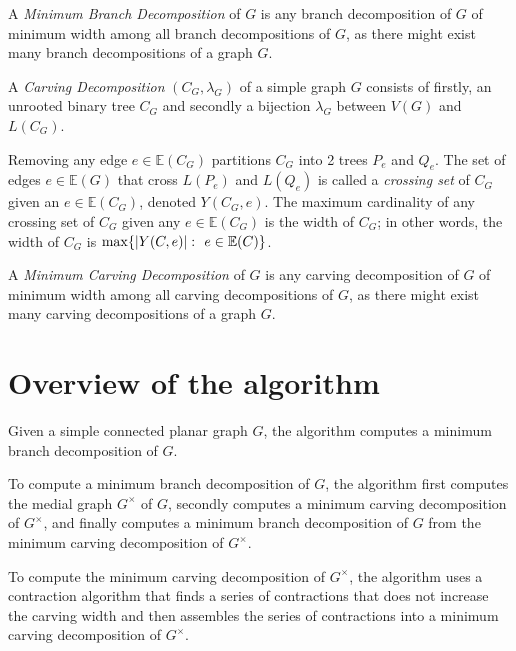 \documentclass{article}
\begin{document}

	A \textit{Minimum Branch Decomposition} of $G$ is any branch decomposition of $G$ of minimum width among all branch decompositions of $G$, as there might exist many branch decompositions of a graph $G$.

	\begin{center}
		
	\end{center}

	A \textit{Carving Decomposition} $(C_G, \lambda_G)$ of a simple graph $G$ consists of firstly, an unrooted binary tree $C_G$ and secondly a bijection $\lambda_G$ between $V(G)$ and $L(C_G)$.

	Removing any edge $e \in \mathbb{E}(C_G)$ partitions $C_G$ into 2 trees $P_e$ and $Q_e$. The set of edges $e \in \mathbb{E}(G)$ that cross $L(P_e)$ and $L(Q_e)$ is called a \textit{crossing set} of $C_G$ given an $e \in \mathbb{E}(C_G)$, denoted $Y(C_G,e)$. The maximum cardinality of any crossing set of $C_G$ given any $e \in \mathbb{E}(C_G)$ is the width of $C_G$; in other words, the width of $C_G$ is $\max\{ |Y(C, e)| \,\colon\  e \in \mathbb{E}(C) \}$.

	A \textit{Minimum Carving Decomposition} of $G$ is any carving decomposition of $G$ of minimum width among all carving decompositions of $G$, as there might exist many carving decompositions of a graph $G$.

	\begin{center}
		
	\end{center}


\section{Overview of the algorithm}

	Given a simple connected planar graph $G$, the algorithm computes a minimum branch decomposition of $G$.

	To compute a minimum branch decomposition of $G$, the algorithm first computes the medial graph $G^\times$ of $G$, secondly computes a minimum carving decomposition of $G^\times$, and finally computes a minimum branch decomposition of $G$ from the minimum carving decomposition of $G^\times$.

	To compute the minimum carving decomposition of $G^\times$, the algorithm uses a contraction algorithm that finds a series of contractions that does not increase the carving width and then assembles the series of contractions into a minimum carving decomposition of $G^\times$.
\end{document}
